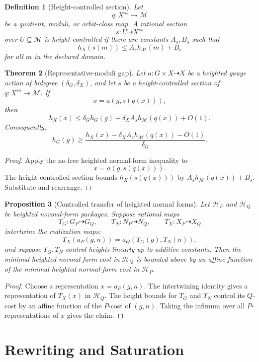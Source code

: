 \documentclass[11pt]{article}
\newtheorem{theorem}{Theorem}[section]
\newtheorem{proposition}[theorem]{Proposition}
\newtheorem{definition}[theorem]{Definition}
\begin{document}
\begin{definition}[Height-controlled section]
Let
\[
q:X^{ss}\to\mathcal M
\]
be a quotient, moduli, or orbit-class map. A rational section
\[
s:U\dashrightarrow X^{ss}
\]
over \(U\subseteq\mathcal M\) is height-controlled if there are constants \(A_s,B_s\) such that
\[
h_X(s(m))\le A_s h_{\mathcal M}(m)+B_s
\]
for all \(m\) in the declared domain.
\end{definition}

\begin{theorem}[Representative-moduli gap]
Let \(a:G\times X\dashrightarrow X\) be a heighted gauge action of bidegree \((\delta_G,\delta_X)\), and let \(s\) be a height-controlled section of \(q:X^{ss}\to\mathcal M\). If
\[
x=a(g,s(q(x))),
\]
then
\[
h_X(x)
\le
\delta_G h_G(g)+\delta_X A_s h_{\mathcal M}(q(x))+O(1).
\]
Consequently,
\[
h_G(g)
\ge
\frac{h_X(x)-\delta_X A_s h_{\mathcal M}(q(x))-O(1)}{\delta_G}.
\]
\end{theorem}

\begin{proof}
Apply the no-free heighted normal-form inequality to
\[
x=a(g,s(q(x))).
\]
The height-controlled section bounds \(h_X(s(q(x)))\) by \(A_s h_{\mathcal M}(q(x))+B_s\). Substitute and rearrange.
\end{proof}

\begin{proposition}[Controlled transfer of heighted normal forms]
Let \(\mathcal H_P\) and \(\mathcal H_Q\) be heighted normal-form packages. Suppose rational maps
\[
T_G:G_P\dashrightarrow G_Q,\qquad
T_N:N_P\dashrightarrow N_Q,\qquad
T_X:X_P\dashrightarrow X_Q
\]
intertwine the realization maps:
\[
T_X(a_P(g,n))=a_Q(T_G(g),T_N(n)),
\]
and suppose \(T_G,T_N\) control heights linearly up to additive constants. Then the minimal heighted normal-form cost in \(\mathcal H_Q\) is bounded above by an affine function of the minimal heighted normal-form cost in \(\mathcal H_P\).
\end{proposition}

\begin{proof}
Choose a representation \(x=a_P(g,n)\). The intertwining identity gives a representation of \(T_X(x)\) in \(\mathcal H_Q\). The height bounds for \(T_G\) and \(T_N\) control its \(Q\)-cost by an affine function of the \(P\)-cost of \((g,n)\). Taking the infimum over all \(P\)-representations of \(x\) gives the claim.
\end{proof}

\section{Rewriting and Saturation}
\end{document}
